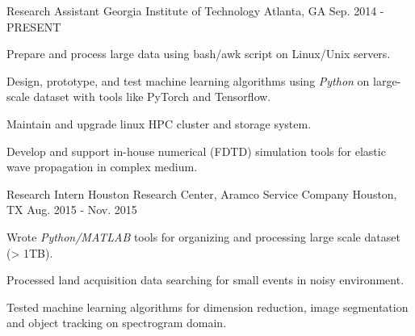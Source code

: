 

\begin{cventries}

  \cventry
    {Research Assistant} %
    {Georgia Institute of Technology} %
    {Atlanta, GA} %
    {Sep. 2014 - PRESENT} %
    {
      \begin{cvitems} %
        \item {Prepare and process large data using bash/awk script on Linux/Unix servers.}        
        \item {Design, prototype, and test machine learning algorithms using \textit{Python} on large-scale dataset with tools like PyTorch and Tensorflow.}
        \item {Maintain and upgrade linux HPC cluster and storage system.}
        \item {Develop and support in-house numerical (FDTD) simulation tools for elastic wave propagation in complex medium.}
      \end{cvitems}
    }

  \cventry
    {Research Intern} %
    {Houston Research Center, Aramco Service Company} %
    {Houston, TX} %
    {Aug. 2015 - Nov. 2015} %
    {
      \begin{cvitems} %
        \item {Wrote \textit{Python/MATLAB} tools for organizing and processing large scale dataset (> 1TB).}
        \item {Processed land acquisition data searching for small events in noisy environment.}
        \item {Tested machine learning algorithms for dimension reduction, image segmentation and object tracking on spectrogram domain.}
      \end{cvitems}
    }


\end{cventries}
